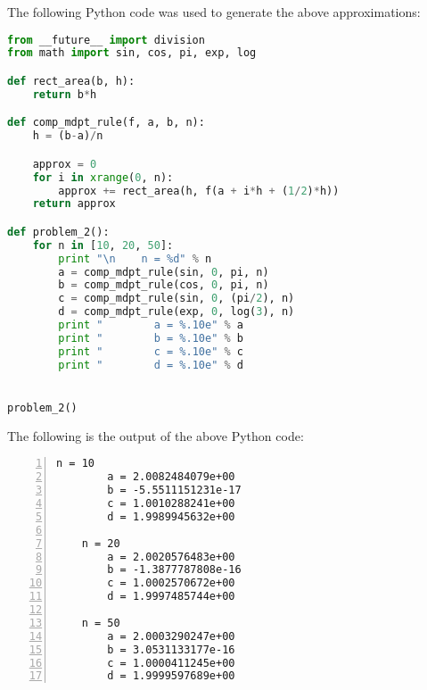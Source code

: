 \documentclass[12pt]{article}
\begin{document}
The following Python code was used to generate the above approximations:
\begin{lstlisting}[language=Python, caption=Problem 2 source code]
from __future__ import division
from math import sin, cos, pi, exp, log

def rect_area(b, h):
    return b*h

def comp_mdpt_rule(f, a, b, n):
    h = (b-a)/n

    approx = 0
    for i in xrange(0, n):
        approx += rect_area(h, f(a + i*h + (1/2)*h))
    return approx

def problem_2():
    for n in [10, 20, 50]:
        print "\n    n = %d" % n
        a = comp_mdpt_rule(sin, 0, pi, n)
        b = comp_mdpt_rule(cos, 0, pi, n)
        c = comp_mdpt_rule(sin, 0, (pi/2), n)
        d = comp_mdpt_rule(exp, 0, log(3), n)
        print "        a = %.10e" % a
        print "        b = %.10e" % b
        print "        c = %.10e" % c
        print "        d = %.10e" % d


problem_2()
\end{lstlisting}
The following is the output of the above Python code:
\begin{Verbatim}[fontfamily=courier, numbers=left, numbersep=2pt, fontsize=\small]
    n = 10
        a = 2.0082484079e+00
        b = -5.5511151231e-17
        c = 1.0010288241e+00
        d = 1.9989945632e+00

    n = 20
        a = 2.0020576483e+00
        b = -1.3877787808e-16
        c = 1.0002570672e+00
        d = 1.9997485744e+00

    n = 50
        a = 2.0003290247e+00
        b = 3.0531133177e-16
        c = 1.0000411245e+00
        d = 1.9999597689e+00
\end{Verbatim}
\end{document}
